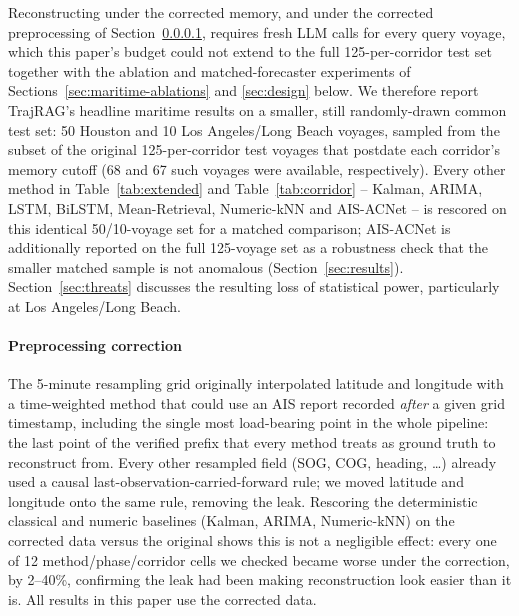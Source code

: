 Reconstructing under the corrected memory, and under the corrected
preprocessing of Section~\ref{sec:preprocessing}, requires fresh LLM calls
for every query voyage, which this paper's budget could not extend to the
full 125-per-corridor test set together with the ablation and
matched-forecaster experiments of Sections~\ref{sec:maritime-ablations} and
\ref{sec:design} below. We therefore report TrajRAG's headline maritime
results on a smaller, still randomly-drawn common test set: 50 Houston and
10 Los Angeles/Long Beach voyages, sampled from the subset of the original
125-per-corridor test voyages that postdate each corridor's memory cutoff
(68 and 67 such voyages were available, respectively). Every other method
in Table~\ref{tab:extended} and Table~\ref{tab:corridor} -- Kalman, ARIMA,
LSTM, BiLSTM, Mean-Retrieval, Numeric-kNN and AIS-ACNet -- is rescored on
this identical 50/10-voyage set for a matched comparison; AIS-ACNet is
additionally reported on the full 125-voyage set as a robustness check that
the smaller matched sample is not anomalous (Section~\ref{sec:results}).
Section~\ref{sec:threats} discusses the resulting loss of statistical power,
particularly at Los Angeles/Long Beach.

\paragraph{Preprocessing correction}
\label{sec:preprocessing}
The 5-minute resampling grid originally interpolated latitude and longitude
with a time-weighted method that could use an AIS report recorded
\emph{after} a given grid timestamp, including the single most load-bearing
point in the whole pipeline: the last point of the verified prefix that
every method treats as ground truth to reconstruct from. Every other
resampled field (SOG, COG, heading, \ldots) already used a causal
last-observation-carried-forward rule; we moved latitude and longitude onto
the same rule, removing the leak. Rescoring the deterministic classical and
numeric baselines (Kalman, ARIMA, Numeric-kNN) on the corrected data versus
the original shows this is not a negligible effect: every one of 12
method/phase/corridor cells we checked became worse under the correction,
by 2--40\%, confirming the leak had been making reconstruction look easier
than it is. All results in this paper use the corrected data.

